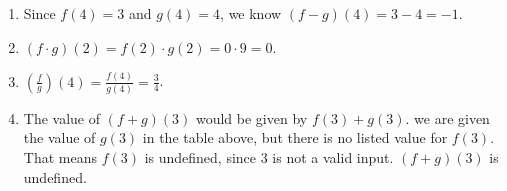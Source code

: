 \documentclass{ximera}
\begin{document}
\begin{example}
\begin{explanation}
\begin{enumerate}
				\item Since $f(4)=3$ and $g(4)=4$, we know $(f-g)(4)=3-4 = -1$.

				\item $(f\cdot g)(2) = f(2)\cdot g(2) = 0 \cdot 9 = 0$.

				\item $\left( \frac{f}{g}\right)(4) = \frac{f(4)}{g(4)}=\frac{3}{4}$.
				
				\item The value of $(f+g)(3)$ would be given by $f(3)+g(3)$. we are given the value of $g(3)$ in the table above, but there is no listed
					value for $f(3)$. That means $f(3)$ is undefined, since $3$ is not a valid input. $(f+g)(3)$ is undefined.
			\end{enumerate}
		\end{explanation}
	\end{example}	
\end{document}
